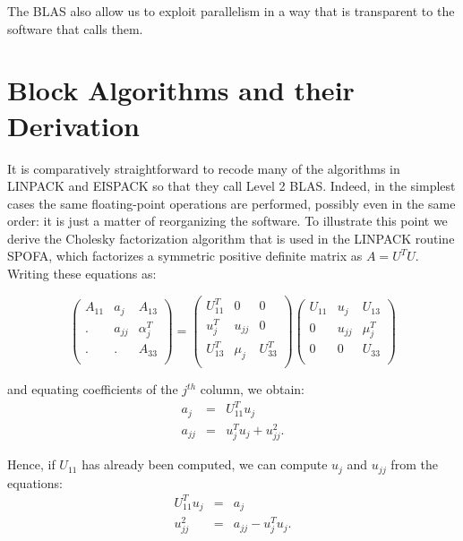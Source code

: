 The BLAS also allow us to exploit parallelism in a way that is transparent
to the software that calls them.

\section{Block Algorithms and their
Derivation}\label{secblockalg}

It is comparatively straightforward to recode many of the algorithms in
LINPACK and EISPACK so that they call Level 2 BLAS.
Indeed, in the simplest
cases the same floating-point operations are performed, possibly even in
the same order: it is just a matter of reorganizing the software. To
illustrate
this point we derive the Cholesky factorization algorithm that is used in
the
LINPACK routine SPOFA, which
factorizes a symmetric positive definite matrix
as $A = U^T U$. Writing these equations as:

$$
\left( \begin{array}{ccc}
A_{11}   & a_j     & A_{13}       \\
.        & a_{jj}  & \alpha_{j}^T \\
.        & .       & A_{33}       \\
\end{array} \right) =
\left( \begin{array}{ccc}
U_{11}^T & 0       & 0            \\
u_{j}^T  & u_{jj}  & 0            \\
U_{13}^T & \mu_j   & U_{33}^T     \\
\end{array} \right)
\left( \begin{array}{ccc}
U_{11}   & u_j     & U_{13}       \\
0        & u_{jj}  & \mu_{j}^T    \\
0        & 0       & U_{33}   \\
\end{array} \right)
$$

and equating coefficients of the $j^{th}$ column, we obtain:
\begin{eqnarray*}
a_j    & = & U_{11}^T u_j \\
a_{jj} & = & u_{j}^T u_j + u_{jj}^2.
\end{eqnarray*}

Hence, if $U_{11}$ has already been computed, we can compute $u_j$ and
$u_{jj}$
from the equations:
\begin{eqnarray*}
U_{11}^T u_j & = & a_j \\
u_{jj}^2     & = & a_{jj} - u_{j}^T u_j.
\end{eqnarray*}

